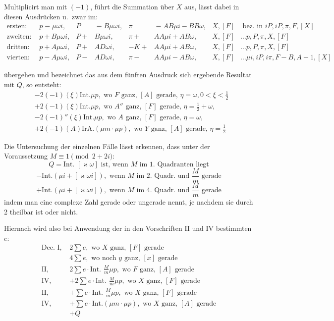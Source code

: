 \documentclass[12pt,a4paper]{article}
\begin{document}
Multiplicirt man mit $(-1)$, führt die Summation über $X$ aus, lässt dabei in diesen Ausdrücken u.~zwar im:
\begin{align*}
\text{ersten: } &p \equiv \mu \omega i, & P &\equiv B\mu \omega i, & \pi &\equiv AB\mu i - BB\omega, & X, [F] &\text{ bez. in } iP, iP, \pi, F, [X]\\
\text{zweiten: } &p + B\mu \omega i, & P + &B\mu \omega i, & \pi + &AA\mu i + AB\omega, & X, [F] &\ldots p, P, \pi, X, [F]\\
\text{dritten: } &p + A\mu \omega i, & P + &AD\omega i, & -K + &AA\mu i + AB\omega, & X, [F] &\ldots p, P, \pi, X, [F]\\
\text{vierten: } &p - A\mu \omega i, & P - &AD\omega i, & \pi - &AA\mu i - AB\omega, & X, [F] &\ldots \mu i, iP, i\pi, F - B, A - 1, [X]
\end{align*}

übergehen und bezeichnet das aus dem fünften Ausdruck sich ergebende Resultat mit $Q$, so entsteht:
\begin{align*}
&-2(-1)(\xi) \text{Int.}\mu p, \text{ wo } F \text{ ganz, } [A] \text{ gerade, } \eta = \omega, 0 < \xi < \frac{1}{2}\\
&+ 2(-1)(\xi) \text{Int.}\mu p, \text{ wo } A'' \text{ ganz, } [F] \text{ gerade, } \eta = \frac{1}{2} + \omega,\\
&-2(-1)''(\xi) \text{Int.}\mu p, \text{ wo } A \text{ ganz, } [F] \text{ gerade, } \eta = \omega,\\
&+ 2(-1)(A) \text{IrA.}(\mu m \cdot \mu p), \text{ wo } Y \text{ ganz, } [A] \text{ gerade, } \eta = \frac{1}{2}
\end{align*}

Die Untersuchung der einzelnen Fälle lässt erkennen, dass unter der Voraussetzung $M \equiv 1 \pmod{2 + 2i}$:
\[
Q = \text{Int. } [\varkappa \omega] \text{ ist, wenn } M \text{ im 1. Quadranten liegt}
\]
\[
- \text{Int.}(\mu i + [\varkappa \omega i]), \text{ wenn } M \text{ im 2. Quadr. und } \frac{M}{m} \text{ gerade}
\]
\[
+ \text{Int.}(\mu i + [\varkappa \omega i]), \text{ wenn } M \text{ im 4. Quadr. und } \frac{M}{m} \text{ gerade}
\]
indem man eine complexe Zahl gerade oder ungerade nennt, je nachdem sie durch 2 theilbar ist oder nicht.

Hiernach wird also bei Anwendung der in den Vorschriften II und IV bestimmten $e$:
\begin{align*}
\text{Dec. I, } &2\sum e, \text{ wo } X \text{ ganz, } [F] \text{ gerade}\\
&4\sum e, \text{ wo noch } y \text{ ganz, } [x] \text{ gerade}\\
\text{II, } &2\sum e \cdot \text{Int. } \frac{M}{m} \mu p, \text{ wo } F \text{ ganz, } [A] \text{ gerade}\\
\text{IV, } &+2\sum e \cdot \text{Int. } \frac{M}{m} \mu p, \text{ wo } X \text{ ganz, } [F] \text{ gerade}\\
\text{II, } &+\sum e \cdot \text{Int. } \frac{M}{m} \mu p, \text{ wo } X \text{ ganz, } [F] \text{ gerade}\\
\text{IV, } &+\sum e \cdot \text{Int.}(\mu m \cdot \mu p), \text{ wo } X \text{ ganz, } [A] \text{ gerade}\\
&+ Q
\end{align*}
\end{document}
